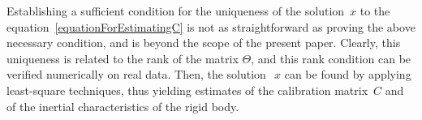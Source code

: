 Establishing a sufficient condition for the uniqueness of the solution~$x$ to the equation~\eqref{equationForEstimatingC}
is not as straightforward as proving the above necessary condition, and is beyond the scope of the present paper. Clearly, this uniqueness is related to 
the rank of the matrix $\Theta$, and this rank condition can be verified numerically on real data.
Then, the solution~$~x$ can be found by applying least-square techniques, thus yielding estimates of the calibration matrix~$C$ and of the inertial
characteristics of the rigid body.


